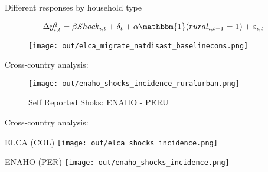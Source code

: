 \documentclass[aspectratio = 169]{beamer}
\begin{document}
\begin{frame}{Different responses by household type}

	\vspace{-20pt}
	\begin{align*} 
	    \Delta y^{q}_{i, t} = \beta Shock_{i,t} + \delta_{t} + \alpha \mathbbm{1}(rural_{i,t-1}=1) + \varepsilon_{i,t}
	\end{align*}
	
	\vspace{-10pt}
   \begin{figure}
		\texttt{[image: out/elca\_migrate\_natdisast\_baselinecons.png]}
   \end{figure}   

\end{frame}

\begin{frame}{Cross-country analysis:}

	\begin{figure}
		\caption{Self Reported Shoks: ENAHO - PERU}
		\texttt{[image: out/enaho\_shocks\_incidence\_ruralurban.png]}
   \end{figure}   

\end{frame}


\begin{frame}{Cross-country analysis:}

    \begin{minipage}{0.48\textwidth}
        \centering
		ELCA (COL)
        \texttt{[image: out/elca\_shocks\_incidence.png]}
    \end{minipage}
    \hfill
    \begin{minipage}{0.48\textwidth}
        \centering
		ENAHO (PER)
        \texttt{[image: out/enaho\_shocks\_incidence.png]}
    \end{minipage}

\end{frame}
\end{document}
